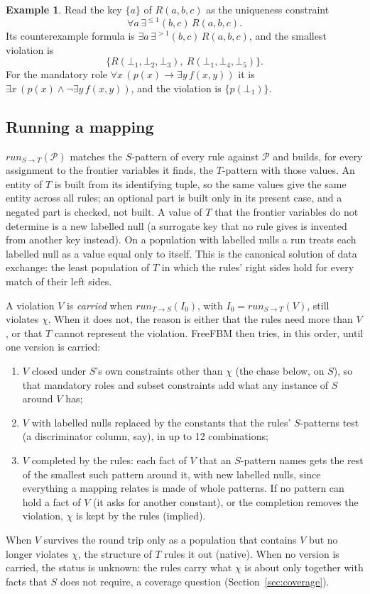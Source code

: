 \documentclass[11pt]{amsart}
\theoremstyle{definition}
\newtheorem{example}{Example}
\theoremstyle{remark}
\newcommand{\pop}{\mathcal{P}}
\begin{document}
\begin{example}
Read the key $\{a\}$ of $R(a, b, c)$ as the uniqueness constraint
$$\forall a\, \exists^{\le 1} (b, c)\, R(a, b, c).$$
Its counterexample formula is $\exists a\, \exists^{> 1} (b, c)\, R(a, b, c)$, and the
smallest violation is
$$\{ R(\bot_1, \bot_2, \bot_3),\ R(\bot_1, \bot_4, \bot_5) \}.$$
For the mandatory role $\forall x\, (p(x) \to \exists y\, f(x, y))$ it is
$\exists x\, (p(x) \wedge \neg \exists y\, f(x, y))$, and the violation is
$\{ p(\bot_1) \}$.
\end{example}

\subsection{Running a mapping}
\label{sec:running}

$\mathit{run}_{S \to T}(\pop)$ matches the $S$-pattern of every rule
against $\pop$ and builds, for every assignment to the frontier variables
it finds, the $T$-pattern with those values. An entity of $T$ is built from
its identifying tuple, so the same values give the same entity across all
rules; an optional part is built only in its present case, and a negated
part is checked, not built. A value of $T$ that the frontier variables do
not determine is a new labelled null (a surrogate key that no rule gives is
invented from another key instead). On a population with labelled nulls a
run treats each labelled null as a value equal only to itself. This is the
canonical solution of data exchange: the least population of $T$ in which
the rules' right sides hold for every match of their left sides.

A violation $V$ is \emph{carried} when $\mathit{run}_{T \to S}(I_0)$, with
$I_0 = \mathit{run}_{S \to T}(V)$, still violates $\chi$. When it does not,
the reason is either that the rules need more than $V$, or that $T$ cannot
represent the violation. FreeFBM then tries, in this order, until one
version is carried:
\begin{enumerate}
  \item $V$ closed under $S$'s own constraints other than $\chi$ (the chase
    below, on $S$), so that mandatory roles and subset constraints add what
    any instance of $S$ around $V$ has;
  \item $V$ with labelled nulls replaced by the constants that the rules'
    $S$-patterns test (a discriminator column, say), in up to 12
    combinations;
  \item $V$ completed by the rules: each fact of $V$ that an $S$-pattern
    names gets the rest of the smallest such pattern around it, with new
    labelled nulls, since everything a mapping relates is made of whole
    patterns. If no pattern can hold a fact of $V$ (it asks for another
    constant), or the completion removes the violation, $\chi$ is kept by
    the rules (implied).
\end{enumerate}
When $V$ survives the round trip only as a population that contains $V$
but no longer violates $\chi$, the structure of $T$ rules it out (native).
When no version is carried, the status is unknown: the rules carry what
$\chi$ is about only together with facts that $S$ does not require, a
coverage question (Section~\ref{sec:coverage}).
\end{document}
